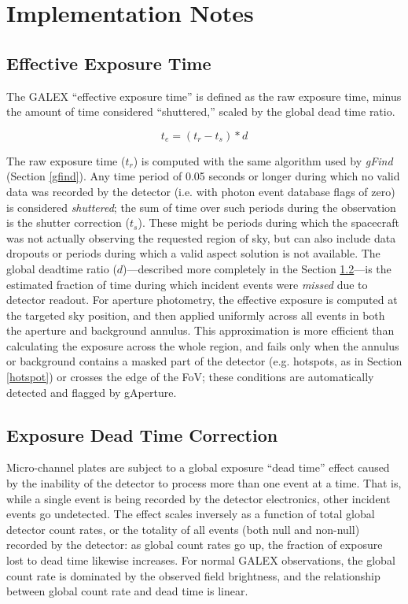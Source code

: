 \documentclass[preprint]{aastex}
\begin{document}
\section{Implementation Notes}
\label{implementation}

\subsection{Effective Exposure Time}
\label{effexptime}
The GALEX ``effective exposure time'' is defined as the raw exposure time, minus the amount of time considered ``shuttered,'' scaled by the global dead time ratio.

\[t_e=(t_r-t_s)*d\]

The raw exposure time ($t_r$) is computed with the same algorithm used by \emph{gFind} (Section \ref{gfind}). Any time period of 0.05 seconds or longer during which no valid data was recorded by the detector (i.e. with photon event database flags of zero) is considered \emph{shuttered}; the sum of time over such periods during the observation is the shutter correction ($t_s$). These might be periods during which the spacecraft was not actually observing the requested region of sky, but can also include data dropouts or periods during which a valid aspect solution is not available. The global deadtime ratio ($d$)---described more completely in the Section \ref{deadtimedesc}---is the estimated fraction of time during which incident events were \emph{missed} due to detector readout. For aperture photometry, the effective exposure is computed at the targeted sky position, and then applied uniformly across all events in both the aperture and background annulus. This approximation is more efficient than calculating the exposure across the whole region, and fails only when the annulus or background contains a masked part of the detector (e.g. hotspots, as in Section \ref{hotspot}) or crosses the edge of the FoV; these conditions are automatically detected and flagged by gAperture.

\subsection{Exposure Dead Time Correction}
\label{deadtimedesc}
Micro-channel plates are subject to a global exposure ``dead time'' effect caused by the inability of the detector to process more than one event at a time. That is, while a single event is being recorded by the detector electronics, other incident events go undetected. The effect scales inversely as a function of total global detector count rates, or the totality of all events (both null and non-null) recorded by the detector: as global count rates go up, the fraction of exposure lost to dead time likewise increases. For normal GALEX observations, the global count rate is dominated by the observed field brightness, and the relationship between global count rate and dead time is linear.
\end{document}
